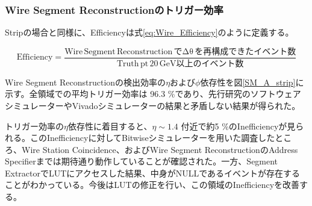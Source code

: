 \subsubsection{Wire Segment Reconstructionのトリガー効率}
\par
Stripの場合と同様に、Efficiencyは式\ref{eq:Wire_Efficiency}のように定義する。

\begin{equation}
    \mathrm {Efficiency} = \frac{\mathrm{Wire\,Segment \,Reconstruction\,で\Delta\theta\,を再構成できたイベント数}}{\mathrm{Truth\,pt \,20 \,GeV以上のイベント数}}
    \label{eq:Wire_Efficiency}
\end{equation}


Wire Segment Reconstructionの検出効率の$\eta$および$\phi$依存性を図\ref{SM_A_strip}に示す。全領域での平均トリガー効率は 96.3 \%であり、先行研究のソフトウェアシミュレーターやVivadoシミュレーターの結果と矛盾しない結果が得られた。

トリガー効率の$\eta$依存性に着目すると、$\eta \sim 1.4$ 付近で約5 \%のInefficiencyが見られる。このInefficiencyに対してBitwiseシミュレーターを用いた調査したところ、Wire Station Coincidence、およびWire Segment ReconstructionのAddress Specifierまでは期待通り動作していることが確認された。一方、Segment ExtractorでLUTにアクセスした結果、中身がNULLであるイベントが存在することがわかっている。今後はLUTの修正を行い、この領域のInefficiencyを改善する。

